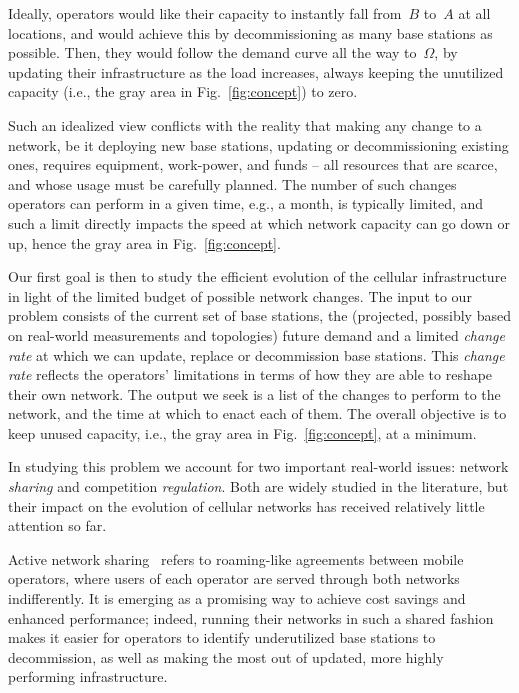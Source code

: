 \documentclass[10pt,journal,cspaper,compsoc]{IEEEtran}
\newcommand{\Fig}[1]{Fig.~\ref{fig:#1}}
\begin{document}
Ideally, operators would like their capacity to instantly fall from~$B$ to~$A$
at all locations, and would achieve this
by decommissioning as many base stations as possible.
Then, they would follow the demand curve all the way to~$\Omega$,
by updating their infrastructure as the load increases, always
keeping the unutilized capacity (i.e., the gray area in \Fig{concept}) to zero.

Such an idealized view conflicts with the reality that making any change to a network,
be it deploying new base stations, updating or decommissioning existing ones,
requires equipment, work-power, and funds -- all resources that are scarce, and whose usage must be carefully planned.
The number of such changes operators can perform in a given time, e.g., a month, is typically limited, and such a limit directly impacts the speed at which network capacity can go down or up, hence the gray area in \Fig{concept}.

Our first goal is then to study the efficient evolution of the cellular infrastructure in light of
the limited budget of possible network changes.
The input to our problem consists of the current set of base stations, the
(projected, possibly based on real-world measurements and topologies)
future demand and a limited {\em change rate} at which we can update, replace or decommission base stations.
This \emph{change rate} reflects the operators' limitations in terms of how they are able to reshape their
own network.
The output we seek is a list of the changes to perform to the network,
and the time at which to enact each of them.
The overall objective is to keep unused capacity, i.e., the gray area in \Fig{concept}, at a minimum.

In studying this problem we account for two important real-world issues: network {\em sharing} and competition {\em regulation}.
Both are widely studied in the literature, but their impact on the evolution of cellular networks has received
relatively little attention so far.

Active network sharing~\cite{leng2014,doyle2014} refers to roaming-like agreements between mobile operators, where users of each operator are served through both networks indifferently.
It is emerging as a promising way to achieve cost savings and enhanced performance; indeed, running their 
networks in such a shared fashion makes it easier for operators to identify underutilized base stations to 
decommission, as well as making the most out of updated, more highly performing infrastructure.
\end{document}
